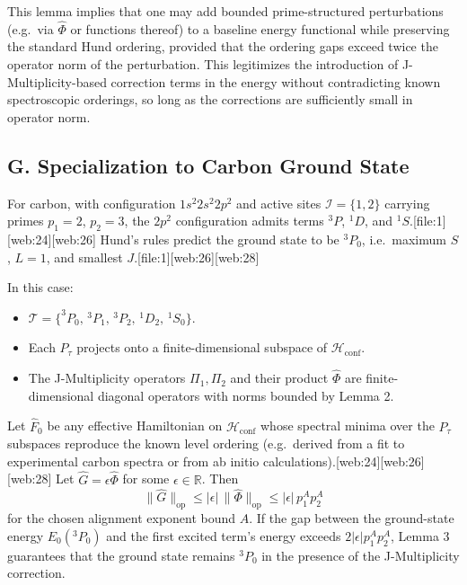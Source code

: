 \documentclass[11pt]{article}
\begin{document}
This lemma implies that one may add bounded prime-structured perturbations (e.g.\ via \(\widehat{\Phi}\) or functions thereof) to a baseline energy functional while preserving the standard Hund ordering, provided that the ordering gaps exceed twice the operator norm of the perturbation. This legitimizes the introduction of J-Multiplicity-based correction terms in the energy without contradicting known spectroscopic orderings, so long as the corrections are sufficiently small in operator norm.

\subsection*{G. Specialization to Carbon Ground State}

For carbon, with configuration \(1s^2 2s^2 2p^2\) and active sites \(\mathcal{I} = \{1,2\}\) carrying primes \(p_1 = 2\), \(p_2 = 3\), the \(2p^2\) configuration admits terms \(^{3}P\), \(^{1}D\), and \(^{1}S\).[file:1][web:24][web:26] Hund's rules predict the ground state to be \(^{3}P_0\), i.e.\ maximum \(S\), \(L =1\), and smallest \(J\).[file:1][web:26][web:28]

In this case:
\begin{itemize}
  \item \(\mathcal{T} = \{ ^3P_0,\, ^3P_1,\, ^3P_2,\, ^1D_2,\, ^1S_0 \}\).
  \item Each \(P_\tau\) projects onto a finite-dimensional subspace of \(\mathcal{H}_{\text{conf}}\).
  \item The J-Multiplicity operators \(\Pi_1, \Pi_2\) and their product \(\widehat{\Phi}\) are finite-dimensional diagonal operators with norms bounded by Lemma 2.
\end{itemize}

Let \(\widehat{F}_0\) be any effective Hamiltonian on \(\mathcal{H}_{\text{conf}}\) whose spectral minima over the \(P_\tau\) subspaces reproduce the known level ordering (e.g.\ derived from a fit to experimental carbon spectra or from ab initio calculations).[web:24][web:26][web:28] Let \(\widehat{G} = \epsilon \widehat{\Phi}\) for some \(\epsilon \in \mathbb{R}\). Then
\[
\|\widehat{G}\|_{\text{op}} \le |\epsilon| \, \|\widehat{\Phi}\|_{\text{op}}
\le |\epsilon| \, p_1^{A} p_2^{A}
\]
for the chosen alignment exponent bound \(A\). If the gap between the ground-state energy \(E_0(^3P_0)\) and the first excited term's energy exceeds \(2 |\epsilon| p_1^{A} p_2^{A}\), Lemma 3 guarantees that the ground state remains \(^{3}P_0\) in the presence of the J-Multiplicity correction.
\end{document}
